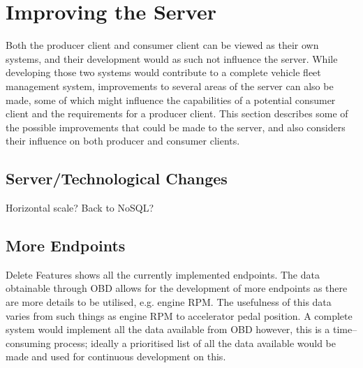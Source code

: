 \section{Improving the Server}\label{sec:fw_server}
Both the producer client and consumer client can be viewed as their own systems, and their development would as such not influence the server.
While developing those two systems would contribute to a complete vehicle fleet management system, improvements to several areas of the server can also be made, some of which might influence the capabilities of a potential consumer client and the requirements for a producer client.
This section describes some of the possible improvements that could be made to the server, and also considers their influence on both producer and consumer clients.
\subsection{Server/Technological Changes}
Horizontal scale?
Back to NoSQL?
\subsection{More Endpoints}
Delete Features
 shows all the currently implemented endpoints.
The data obtainable through \ac{OBD} allows for the development of more endpoints as there are more details to be utilised, e.g. engine RPM.
The usefulness of this data varies from such things as engine RPM to accelerator pedal position.
A complete system would implement all the data available from \ac{OBD} however, this is a time--consuming process; ideally a prioritised list of all the data available would be made and used for continuous development on this.
